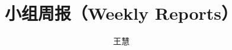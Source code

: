\documentclass[a4paper]{article}
\title{小组周报（Weekly Reports）}
\author{王慧}
\begin{document}
\begin{CJK}{UTF8}{gbsn}
\CJKindent
\maketitle
\begin{comment}

\begin{abstract}
这是一个关于小组周报的共享工程文档，请大家认真阅读。\\
This is a shared project about group weekly reports. Please read carefully. 

1. 请在属于您的部分（part）编辑每周的学习、研究进展（每人每周新增一个section）。亦可在文档中留下问题。小组成员均可按照以下两种方式编辑答复：\\
Please edit your weekly reports on learning and research progress. You can also left some questions that may be answers by any members in our group via the following two modes:
\begin{itemize}
\item 直接在正文中回答（Edit answers directly below the questions）：\\
Q: 何谓语义安全（Waht means semantic security）？\\
A: 密文不泄露明文的任何信息（The ciphertexts leaks nothing about the corresponding plaintexts）。
\item 以边注方式回答（Edit answers at the margin of the pages）：\\
Q: 何谓语义安全？\todo{A: 密文不泄露明文的任何信息（The ciphertexts leaks nothing about the corresponding plaintexts）。}
\end{itemize}

2. 最好是在提问时把相关的参考文献（仅限pdf）也上传到我们的共享工程里的references文件夹中。我在这里上传了Kish12文献，以供参考。\\
It is better to upload the related references (pdf only) to the folder of references of our shared project.

3. 鼓励大家用英文编写周报。\\
You are encouraged to write your weekly reports in English. Just take is as a weekly training: Even Chinglish is OK.

\bigskip

注：即使周报不是强制性的，小组成员学会熟练用latex写论文，是强制性的必须学会的本领。\\

Remark: Even you are not obligated to edit weekly reports, you must learn how to write papers by using Latex skillfully. 


\end{comment}
\end{CJK}
\end{document}
